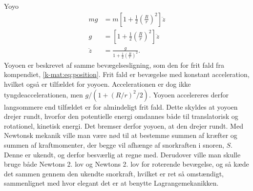 \documentclass[crop=false, class=memoir]{standalone}
\begin{document}
\begin{opgave}[2]{Yoyo}
\begin{align*}
	mg &= m\left[1 + \frac{1}{2}\left(\frac{R}{r}\right)^2\right]\ddot{z} \\
	g &= \left[1 + \frac{1}{2}\left(\frac{R}{r}\right)^2\right]\ddot{z} \\
	\ddot{z} &= \frac{g}{1 + \frac{1}{2}\left(\frac{R}{r}\right)^2}.
\end{align*}
%
\opg Yoyoen er beskrevet af samme bevægelsesligning, som den for frit fald fra kompendiet, \cref{k-mat:eq:position}. Frit fald er bevægelse med konstant acceleration, hvilket også er tilfældet for yoyoen. Accelerationen er dog ikke tyngdeaccelerationen, men $g/(1 + (R/r)^2/2)$. Yoyoen accelereres derfor langsommere end tilfældet er for almindeligt frit fald. Dette skyldes at yoyoen drejer rundt, hvorfor den potentielle energi omdannes både til translatorisk og rotationel, kinetisk energi. Det bremser derfor yoyoen, at den drejer rundt.
%
\opg Med Newtonsk mekanik ville man være nød til at bestemme summen af kræfter og summen af kraftmomenter, der begge vil afhænge af snorkraften i snoren, $S$. Denne er ukendt, og derfor besværlig at regne med. Derudover ville man skulle bruge både Newtons 2. lov og Newtons 2. lov for roterende bevægelse, og så kæde det sammen gennem den ukendte snorkraft, hvilket er ret så omstændigt, sammenlignet med hvor elegant det er at benytte Lagrangemekanikken.
\end{opgave}
\end{document}
